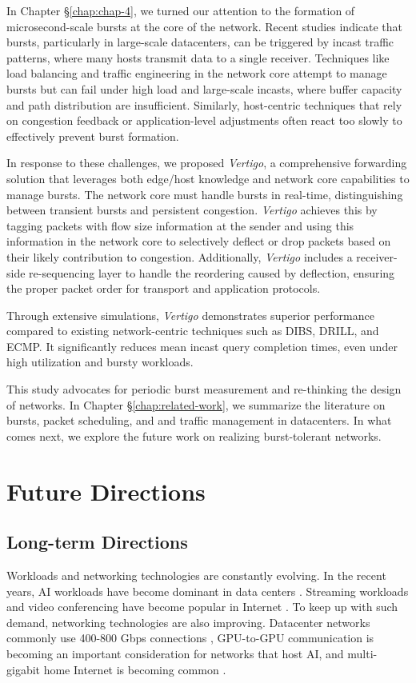 In Chapter \S\ref{chap:chap-4}, we turned our attention to the formation of microsecond-scale bursts at the core of the network. Recent studies indicate that bursts, particularly in large-scale datacenters, can be triggered by incast traffic patterns, where many hosts transmit data to a single receiver. Techniques like load balancing and traffic engineering in the network core attempt to manage bursts but can fail under high load and large-scale incasts, where buffer capacity and path distribution are insufficient. Similarly, host-centric techniques that rely on congestion feedback or application-level adjustments often react too slowly to effectively prevent burst formation.

In response to these challenges, we proposed \textit{Vertigo}, a comprehensive forwarding solution that leverages both edge/host knowledge and network core capabilities to manage bursts. The network core must handle bursts in real-time, distinguishing between transient bursts and persistent congestion. \textit{Vertigo} achieves this by tagging packets with flow size information at the sender and using this information in the network core to selectively deflect or drop packets based on their likely contribution to congestion. Additionally, \textit{Vertigo} includes a receiver-side re-sequencing layer to handle the reordering caused by deflection, ensuring the proper packet order for transport and application protocols.

Through extensive simulations, \textit{Vertigo} demonstrates superior performance compared to existing network-centric techniques such as DIBS, DRILL, and ECMP. It significantly reduces mean incast query completion times, even under high utilization and bursty workloads. 

This study advocates for periodic burst measurement and re-thinking the design of networks. In Chapter \S\ref{chap:related-work}, we summarize the literature on bursts, packet scheduling, and and traffic management in datacenters. In what comes next, we explore the future work on realizing burst-tolerant networks.



\section{Future Directions}

\subsection{Long-term Directions}
Workloads and networking technologies are constantly evolving. In the recent years, AI workloads have become dominant in data centers \cite{hyperscale,meta}. Streaming workloads and video conferencing have become popular in Internet \cite{pandemic,video,zoom,confucius,gaming}. To keep up with such demand, networking technologies are also improving. Datacenter networks commonly use 400-800 Gbps connections \cite{llm,meta}, GPU-to-GPU communication is becoming an important consideration for networks that host AI, and multi-gigabit home Internet is becoming common \cite{comcast}.

